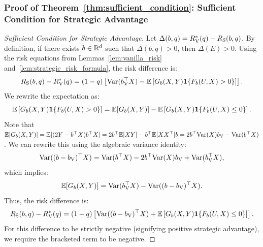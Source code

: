 \subsubsection*{Proof of Theorem~\ref{thm:sufficient_condition}: Sufficient Condition for Strategic Advantage}
\label{app:proof_sufficient_condition}
\begin{proof}[Sufficient Condition for Strategic Advantage]
Let $\Delta(b, q) = R_{\mathrm{V}}^*(q) - R_{\mathrm{S}}(b, q)$. By definition, if there exists $b \in \mathbb{R}^d$ such that $\Delta(b, q) > 0$, then $\Delta(E) > 0$. Using the risk equations from Lemmas~\ref{lem:vanilla_risk} and~\ref{lem:strategic_risk_formula}, the risk difference is:
\begin{equation}
    R_{\mathrm{S}}(b, q) - R_{\mathrm{V}}^*(q) = (1 - q) \left[ \mathrm{Var}(b_{\mathrm{V}}^\top X) - \mathbb{E}\left[ G_b(X, Y) \mathbf{1}\{F_b(U, X) > 0\} \right] \right].
\end{equation}
We rewrite the expectation as:
\begin{equation}
    \mathbb{E}\left[ G_b(X, Y) \mathbf{1}\{F_b(U, X) > 0\} \right] = \mathbb{E}[G_b(X, Y)] - \mathbb{E}\left[ G_b(X, Y) \mathbf{1}\{F_b(U, X) \le 0\} \right].
\end{equation}
Note that $\mathbb{E}[G_b(X, Y)] = \mathbb{E}[(2Y - b^\top X)b^\top X] = 2b^\top \mathbb{E}[XY] - b^\top \mathbb{E}[XX^\top]b = 2b^\top \mathrm{Var}(X)b_{\mathrm{V}} - \mathrm{Var}(b^\top X)$. We can rewrite this using the algebraic variance identity:
\begin{equation}
    \mathrm{Var}((b - b_{\mathrm{V}})^\top X) = \mathrm{Var}(b^\top X) - 2b^\top \mathrm{Var}(X)b_{\mathrm{V}} + \mathrm{Var}(b_{\mathrm{V}}^\top X),
\end{equation}
which implies:
\begin{equation}
    \mathbb{E}[G_b(X, Y)] = \mathrm{Var}(b_{\mathrm{V}}^\top X) - \mathrm{Var}((b - b_{\mathrm{V}})^\top X).
\end{equation}
Thus, the risk difference is:
\begin{equation}
    R_{\mathrm{S}}(b, q) - R_{\mathrm{V}}^*(q) = (1 - q) \left[ \mathrm{Var}((b - b_{\mathrm{V}})^\top X) + \mathbb{E}\left[ G_b(X, Y) \mathbf{1}\{F_b(U, X) \le 0\} \right] \right].
\end{equation}
For this difference to be strictly negative (signifying positive strategic advantage), we require the bracketed term to be negative. 


\end{proof}
